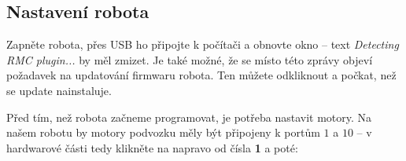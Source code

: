 \documentclass[../main.tex]{subfiles}
\begin{document}
	\begin{figure}[h!]
		\centering
	\end{figure}

	\subsection{Nastavení robota}
	Zapněte robota, přes USB ho připojte k počítači a obnovte okno -- text \textit{Detecting RMC plugin...} by měl zmizet. Je také možné, že se místo této zprávy objeví požadavek na updatování firmwaru robota. Ten můžete odkliknout a počkat, než se update nainstaluje.

	Před tím, než robota začneme programovat, je potřeba nastavit motory. Na našem robotu by motory podvozku měly být připojeny k portům $1$ a $10$ -- v hardwarové části tedy klikněte na  napravo od čísla \textbf{1} a poté:
\end{document}
